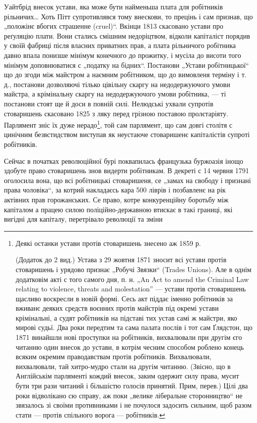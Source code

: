 \parcont{}
Уайтбрід внесок устави, яка може бути найменьша плата
для робітників рільничих\dots{} Хоть Пітт супротивлявся тому
внескови, то прецінь і сам признав, що „положінє вбогих
страшенне (cruel)“. Вкінци 1813 скасовано устави про реґуляцію
плати. Вони стались смішним недоріцтвом, відколи
капіталіст порядив у своїй фабриці після власних приватних
прав, а плата рільничого робітника давно впала понизше
мінімум конечного до прожитку, і мусіла до висоти
того мінімум доповнюватися с „податку на бідних“. Постанови
„Устави робітницької“ що до згоди між майстром
а наємним робітником, що до вимовленя терміну і т. д.,
постанови дозволяючі тілько цівільну скаргу на недодержуючого
умови майстра, а крімінальну скаргу на недодержуючого
умови робітника, — ті постанови стоят ще й доси
в повній силі. Нелюдські ухвали супротів стоваришень
скасовано 1825 з ляку перед грізною поставою пролєтаріяту.
Парлямент зніс їх дуже нерадо\footnote{
Деякі останки устави протів стоваришень знесено аж 1859 р.

(Додаток до 2 вид.) Устава з 29 жовтня 1871 зносит всі устави
протів стоваришень і урядово признає „Робучі Звязки“ (Trades Unions).
Але в однім додатковім акті с того самого дня, п. н. „An Act to amend
the Criminal Law relating to violence, threats and molestation” — устави
протів стоваришень щасливо воскресли в новій формі. Сесь акт піддає
іменно робітників за вживанє деяких средств воєнних протів майстрів
під окремі устави крімінальні, а судят робітників на підставі тих устав
самі ж майстри, яко мирові судьї. Два роки передтим та сама палата
послів і тот сам Ґлядстон, що 1871 винайшли нові проступки на робітників,
вихвалювали при другім єго читанню один внесок до устави, в котрім
чесним способом роблено конець всяким окремим праводавствам
протів робітників. Вихвалювали, вихвалювали, тай хитро-мудро стали на
другім читанню. (Звісно, що в Англійськім парляменті кождий внесок,
заким одержит силу права, мусит бути три рази читаний і більшістю голосів
принятий. Прим, перев.) Цілі два роки відволікано сю справу, аж
поки „велике ліберальне сторонництво“ не звязалось зі своїми противниками
і не почулося задосить сильним, щоб разом стати — протів спільного
ворога — робітників.
},  той сам парлямент, що
сам довгі столітя с цинічним безвстидством виступав як
неустаюче стоваришенє капіталістів супроті робітників.

Сейчас в початках революційної бурі поквапилась французька
буржоазія інощо здобуте право стоваришень знов
видерти робітникам. В декреті с 14 червня 1791 оголосила
вона, що всі робітницькі стоваришеня, се „замах на свободу
і признані права чоловіка“, за котрий накладаєсь кара
500 ліврів і позбавленє на рік актівних прав горожанських.
Се право, котре конкуренційну боротьбу між капіталом
а працею силою поліційно-державною втискає в такі границі,
які вигідні для капіталу, перетрівало революції та зміни
\parbreak{}
